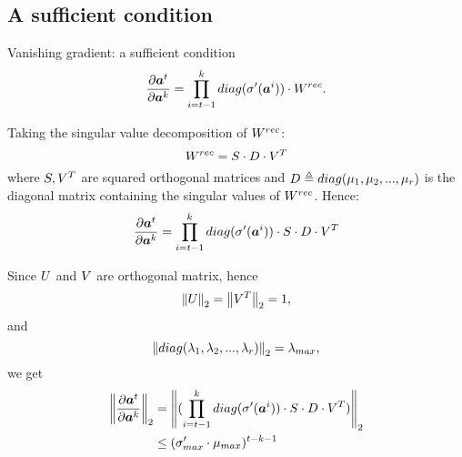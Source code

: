 \subsection{A sufficient condition}
\begin{frame}{Vanishing gradient: a sufficient condition}
	\begin{equation}
	\frac{\partial \boldsymbol{a}^t}{\partial \boldsymbol{a}^k} = \prod_{i=t-1}^{k}  diag(\sigma'(\boldsymbol{a}^i)) \cdot W^{rec}.
	\label{eq:temporalComponent}
	\end{equation}
	
	Taking the singular value decomposition of $W^{rec}$:
	\begin{equation}
	W^{rec} =  S\cdot D\cdot V^T
	\end{equation}
	where $S,V^T$ are squared orthogonal matrices and $D\triangleq diag(\mu_1, \mu_2,...,\mu_r)$ is the diagonal matrix containing the singular values of $W^{rec}$.
	Hence:
	\begin{equation}
	\frac{\partial \boldsymbol{a}^t}{\partial \boldsymbol{a}^k} = \prod_{i=t-1}^{k}  diag(\sigma'(\boldsymbol{a}^i)) \cdot S\cdot D \cdot V^T
	\end{equation}
\end{frame}
\begin{frame}
	Since $U$ and $V$ are orthogonal matrix, hence $$\left\Vert U \right\Vert_2=\left\Vert V^T \right\Vert_2 = 1,$$ and $$\left\Vert diag(\lambda_1, \lambda_2,...,\lambda_r) \right\Vert_2 = \lambda_{max},$$ we get
	\begin{align}
	\left\Vert \frac{\partial \boldsymbol{a}^t}{\partial \boldsymbol{a}^k} \right\Vert_2 &= \left\Vert  (\prod_{i=t-1}^{k} diag(\sigma'(\boldsymbol{a}^i)) \cdot S\cdot D \cdot V^T) \right\Vert_2\\
	&\leq (\sigma'_{max} \cdot \mu_{max})^{t-k-1}
	\end{align}
\end{frame}

